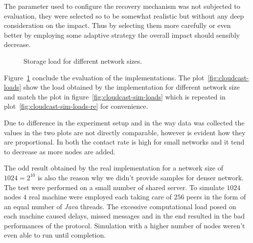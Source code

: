 The parameter used to configure the recovery mechanism was not
subjected to evaluation, they were selected so to be somewhat
realistic but without any deep consideration on the impact. Thus
by selecting them more carefully or even better by employing some
adaptive strategy the overall impact should sensibly decrease.

\begin{figure}[h!]
  \centering
  \caption{Storage \cloud load for different network sizes.}
  \label{fig:cloudcast-loads-global}
\end{figure}

Figure~\ref{fig:cloudcast-loads-global} conclude the evaluation of the
implementations. The plot~\ref{fig:cloudcast-loads} show the \cloud
load obtained by the \grapes implementation for different network
size and match the plot in figure~\ref{fig:cloudcast-sim-loads} which
is repeated in plot~\ref{fig:cloudcast-sim-loads-re} for convenience.

Due to difference in the experiment setup and in the way data was
collected the values in the two plots are not directly comparable,
however is evident how they are proportional. In both the \cloud
contact rate is high for small networks and it tend to decrease as
more nodes are added.

The odd result obtained by the real implementation for a network size
of $1024 = 2^{10}$ is also the reason why we didn't provide samples for
denser network. The test were performed on a small number of shared
server. To simulate $1024$ nodes $4$ real machine were employed each
taking care of $256$ peers in the form of an equal number of
\emph{Java} threads. The excessive computational load posed on each
machine caused delays, missed messages and in the end resulted in the
bad performances of the protocol. Simulation with a higher number of
nodes weren't even able to run until completion.
